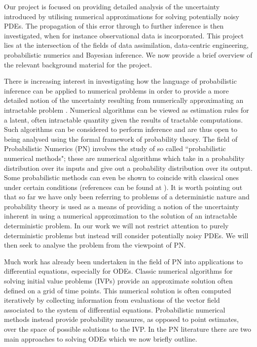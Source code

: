 Our project is focused on providing detailed analysis of the uncertainty introduced by utilising numerical approximations for solving potentially noisy PDEs. The propagation of this error through to further inference is then investigated, when for instance observational data is incorporated. This project lies at the intersection of the fields of data assimilation, data-centric engineering, probabilistic numerics and Bayesian inference. We now provide a brief overview of the relevant background material for the project.

There is increasing interest in investigating how the language of probabilistic inference can be applied to numerical problems in order to provide a more detailed notion of the uncertainty resulting from numerically approximating an intractable problem \textcolor{blue}{\citep{diaconis1988bayesian,o1992bayesian,skilling1992bayesian,hennig2015probabilistic}}. Numerical algorithms can be viewed as estimation rules for a latent, often intractable quantity given the results of tractable computations. Such algorithms can be considered to perform inference and are thus open to being analysed using the formal framework of probability theory. The field of Probabilistic Numerics (PN) \textcolor{blue}{\citep{probNumericsSite}} involves the study of so called ``probabilistic numerical methods"; these are numerical algorithms which take in a probability distribution over its inputs and give out a probability distribution over its output. Some probabilistic methods can even be shown to coincide with classical ones under certain conditions (references can be found at \textcolor{blue}{\citep{probNumericsSite}}). It is worth pointing out that so far we have only been referring to problems of a deterministic nature and probability theory is used as a means of providing a notion of the uncertainty inherent in using a numerical approximation to the solution of an intractable deterministic problem. In our work we will not restrict attention to purely deterministic problems but instead will consider potentially noisy PDEs. We will then seek to analyse the problem from the viewpoint of PN.

Much work has already been undertaken in the field of PN into applications to differential equations, especially for ODEs. Classic numerical algorithms for solving initial value problems (IVPs) provide an approximate solution often defined on a grid of time points. This numerical solution is often computed iteratively by collecting information from evaluations of the vector field associated to the system of differential equations. Probabilistic numerical methods instead provide probability measures, as opposed to point estimates, over the space of possible solutions to the IVP. In the PN literature there are two main approaches to solving ODEs which we now briefly outline.

